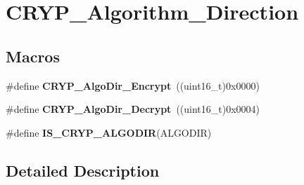 \hypertarget{group___c_r_y_p___algorithm___direction}{\section{C\-R\-Y\-P\-\_\-\-Algorithm\-\_\-\-Direction}
\label{group___c_r_y_p___algorithm___direction}
}
\subsection*{Macros}
\begin{DoxyCompactItemize}
\item 
\hypertarget{group___c_r_y_p___algorithm___direction_gafe38074cbbc3e45883962fd8d5698b4a}{\#define {\bfseries C\-R\-Y\-P\-\_\-\-Algo\-Dir\-\_\-\-Encrypt}~((uint16\-\_\-t)0x0000)}\label{group___c_r_y_p___algorithm___direction_gafe38074cbbc3e45883962fd8d5698b4a}

\item 
\hypertarget{group___c_r_y_p___algorithm___direction_gaaced3e33a4ee660cc07139481a90adb7}{\#define {\bfseries C\-R\-Y\-P\-\_\-\-Algo\-Dir\-\_\-\-Decrypt}~((uint16\-\_\-t)0x0004)}\label{group___c_r_y_p___algorithm___direction_gaaced3e33a4ee660cc07139481a90adb7}

\item 
\#define {\bfseries I\-S\-\_\-\-C\-R\-Y\-P\-\_\-\-A\-L\-G\-O\-D\-I\-R}(A\-L\-G\-O\-D\-I\-R)
\end{DoxyCompactItemize}


\subsection{Detailed Description}


